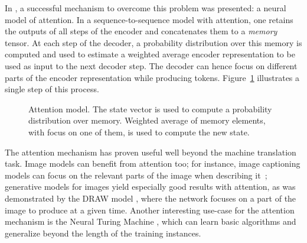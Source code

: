 \documentclass{article}
\begin{document}
In \cite{bahdanau2014neural}, a successful mechanism to overcome
this problem was presented: a neural model of attention.
In a sequence-to-sequence model with attention, one retains
the outputs of all steps of the encoder and concatenates
them to a \emph{memory} tensor. At each step of the decoder,
a probability distribution over this memory is computed
and used to estimate a weighted average encoder representation
to be used as input to the next decoder step.
The decoder can hence focus on different parts of the encoder
representation while producing tokens. Figure~\ref{fig:attn}
illustrates a single step of this process.

\begin{figure}
\begin{center}
\end{center}
\caption{Attention model. The state vector is used to compute a probability
  distribution over memory. Weighted average of memory elements, with focus
  on one of them, is used to compute the new state.}
\label{fig:attn}
\end{figure}

The attention mechanism has proven useful well beyond the machine
translation task. Image models can benefit from attention too;
for instance, image captioning
models can focus on the relevant parts of the image when describing it~\cite{xuetal2015};
generative models for images yield especially good results with
attention, as was demonstrated by the DRAW model \cite{draw},
where the network focuses on a part of the image to produce at a given time.
Another interesting use-case for the attention mechanism is
the Neural Turing Machine \cite{ntm14}, which can learn basic
algorithms and generalize beyond the length of the training instances.
\end{document}
